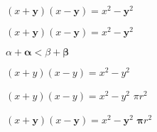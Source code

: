 \documentclass[a4paper]{article}
\begin{document}
$(x+\mathbf{y})(x-\mathbf{y})=x^{2}-{\mathbf{y}}^{2}$

$(x+\bm{y})(x-\bm{y}) \bm{=} x^{2}-{\bm{y}}^{2}$

$\alpha + \bm{\alpha} < \beta + \bm{\beta}$

$(x+y)(x-y)=x^{2}-y^{2}$

{\boldmath $(x+y)(x-y)=x^{2}-y^{2}$ $\pi r^2$}

$(x+\mathbf{y})(x-\mathbf{y})=x^{2}-{\mathbf{y}}^{2}$
$\mathbf{\pi} r^2$ %
\end{document}

